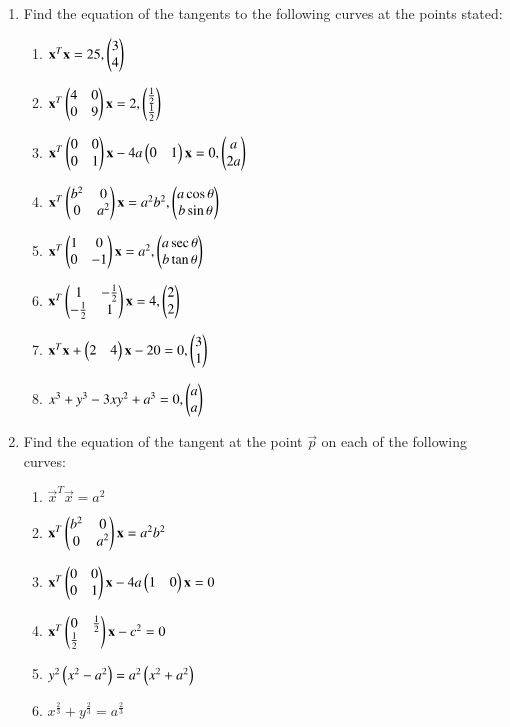 \renewcommand{\theequation}{\theenumi}
\begin{enumerate}[label=\arabic*.,ref=\thesubsection.\theenumi]
\item Find the equation of the tangents to the following curves at the points stated:
\begin{enumerate}
\item
$
\mathbf{x}^T\mathbf{x} = 25, \begin{pmatrix}3\\4\end{pmatrix}
$
\\
\solution

\item
$
\mathbf{x}^T\begin{pmatrix}4 & 0 \\ 0 & 9\end{pmatrix}\mathbf{x} = 2,
 \begin{pmatrix}\frac{1}{2} \\ \frac{1}{2}\end{pmatrix}
$
\item
$
\mathbf{x}^T\begin{pmatrix}0 & 0 \\ 0 & 1\end{pmatrix}\mathbf{x}-4a\begin{pmatrix}0 & 1\end{pmatrix}\mathbf{x}=0, \begin{pmatrix}a\\2a\end{pmatrix}
$
\item
$
\mathbf{x}^T\begin{pmatrix}b^2 & 0\\0 & a^2\end{pmatrix}\mathbf{x}=a^2b^2,
 \begin{pmatrix}a\cos\theta\\b\sin\theta\end{pmatrix}
$
\item
$
\mathbf{x}^T\begin{pmatrix}1 & 0\\0& -1\end{pmatrix}\mathbf{x} = a^2,
 \begin{pmatrix}a\sec\theta\\b\tan\theta\end{pmatrix}
$
\item
$
\mathbf{x}^T\begin{pmatrix}1 & -\frac{1}{2}\\-\frac{1}{2} & 1\end{pmatrix}\mathbf{x}=4,
 \begin{pmatrix}2\\2\end{pmatrix}
$
\item
$
\mathbf{x}^T\mathbf{x}+\begin{pmatrix}2 & 4\end{pmatrix}\mathbf{x}-20=0, \begin{pmatrix}3\\1\end{pmatrix}
$
\item
$
x^3+y^3-3xy^2+a^3 = 0,
 \begin{pmatrix}a\\a\end{pmatrix}
$
\end{enumerate}
\item Find the equation of the tangent at the point $\vec{p}$ on each
of the following curves:
\begin{enumerate}
\item
$
\vec{x}^T\vec{x} = a^2
$
\item
$
\mathbf{x}^T\begin{pmatrix}b^2 & 0\\0 & a^2\end{pmatrix}\mathbf{x}= a^2b^2
$
\item
$
\mathbf{x}^T\begin{pmatrix}0 & 0\\0 & 1\end{pmatrix}\mathbf{x}-4a\begin{pmatrix}1 & 0\end{pmatrix}\mathbf{x} = 0
$
\item
$
\mathbf{x}^T\begin{pmatrix}0 & \frac{1}{2}\\\frac{1}{2}\end{pmatrix}\mathbf{x}-c^2=0
$
\item
$
y^2\left(x^2-a^2\right)=a^2\left(x^2+a^2\right)
$
\item
$
x^{\frac{2}{3}}+y^{\frac{2}{3}}=a^{\frac{2}{3}}
$
\end{enumerate}
\end{enumerate}
